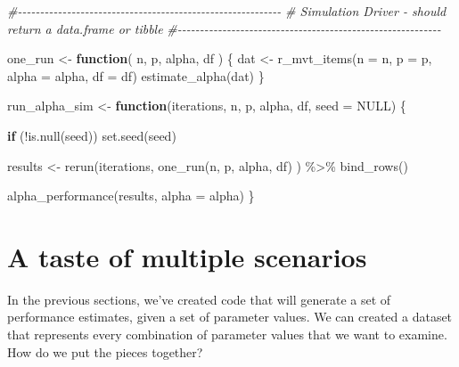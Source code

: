 \documentclass[
]{book}
\newenvironment{Shaded}{\begin{snugshade}}{\end{snugshade}}
\newcommand{\AttributeTok}[1]{\textcolor[rgb]{0.77,0.63,0.00}{#1}}
\newcommand{\CommentTok}[1]{\textcolor[rgb]{0.56,0.35,0.01}{\textit{#1}}}
\newcommand{\ConstantTok}[1]{\textcolor[rgb]{0.00,0.00,0.00}{#1}}
\newcommand{\ControlFlowTok}[1]{\textcolor[rgb]{0.13,0.29,0.53}{\textbf{#1}}}
\newcommand{\FunctionTok}[1]{\textcolor[rgb]{0.00,0.00,0.00}{#1}}
\newcommand{\NormalTok}[1]{#1}
\newcommand{\OtherTok}[1]{\textcolor[rgb]{0.56,0.35,0.01}{#1}}
\newcommand{\SpecialCharTok}[1]{\textcolor[rgb]{0.00,0.00,0.00}{#1}}
\begin{document}
\begin{Shaded}
\begin{Highlighting}[]
\CommentTok{\#{-}{-}{-}{-}{-}{-}{-}{-}{-}{-}{-}{-}{-}{-}{-}{-}{-}{-}{-}{-}{-}{-}{-}{-}{-}{-}{-}{-}{-}{-}{-}{-}{-}{-}{-}{-}{-}{-}{-}{-}{-}{-}{-}{-}{-}{-}{-}{-}{-}{-}{-}{-}{-}{-}{-}{-}{-}{-}{-}}
\CommentTok{\# Simulation Driver {-} should return a data.frame or tibble}
\CommentTok{\#{-}{-}{-}{-}{-}{-}{-}{-}{-}{-}{-}{-}{-}{-}{-}{-}{-}{-}{-}{-}{-}{-}{-}{-}{-}{-}{-}{-}{-}{-}{-}{-}{-}{-}{-}{-}{-}{-}{-}{-}{-}{-}{-}{-}{-}{-}{-}{-}{-}{-}{-}{-}{-}{-}{-}{-}{-}{-}{-}}


\NormalTok{one\_run }\OtherTok{\textless{}{-}} \ControlFlowTok{function}\NormalTok{( n, p, alpha, df ) \{}
\NormalTok{    dat }\OtherTok{\textless{}{-}} \FunctionTok{r\_mvt\_items}\NormalTok{(}\AttributeTok{n =}\NormalTok{ n, }\AttributeTok{p =}\NormalTok{ p, }\AttributeTok{alpha =}\NormalTok{ alpha, }\AttributeTok{df =}\NormalTok{ df)}
    \FunctionTok{estimate\_alpha}\NormalTok{(dat)}
\NormalTok{\}}


\NormalTok{run\_alpha\_sim }\OtherTok{\textless{}{-}} \ControlFlowTok{function}\NormalTok{(iterations, n, p, alpha, df, }\AttributeTok{seed =} \ConstantTok{NULL}\NormalTok{) \{}
  
  \ControlFlowTok{if}\NormalTok{ (}\SpecialCharTok{!}\FunctionTok{is.null}\NormalTok{(seed)) }\FunctionTok{set.seed}\NormalTok{(seed)}

\NormalTok{  results }\OtherTok{\textless{}{-}} 
    \FunctionTok{rerun}\NormalTok{(iterations, }\FunctionTok{one\_run}\NormalTok{(n, p, alpha, df) ) }\SpecialCharTok{\%\textgreater{}\%}
    \FunctionTok{bind\_rows}\NormalTok{()}
  
  \FunctionTok{alpha\_performance}\NormalTok{(results, }\AttributeTok{alpha =}\NormalTok{ alpha)}
\NormalTok{\}}
\end{Highlighting}
\end{Shaded}

\hypertarget{a-taste-of-multiple-scenarios}{%
\section{A taste of multiple scenarios}\label{a-taste-of-multiple-scenarios}}

In the previous sections, we've created code that will generate a set of performance estimates, given a set of parameter values. We can created a dataset that represents every combination of parameter values that we want to examine. How do we put the pieces together?
\end{document}
